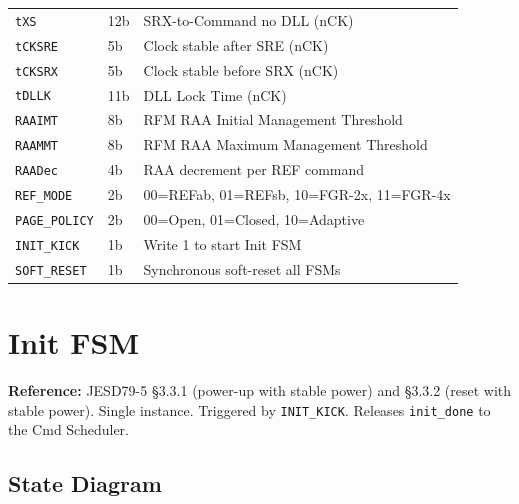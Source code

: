 \documentclass[11pt,a4paper]{article}
\newcommand{\reg}[1]{\textcolor{ddrpurple}{\texttt{#1}}}
\begin{document}
\begin{longtable}{L{3cm} L{2cm} L{9.3cm}}
\reg{tXS}         & 12b & SRX-to-Command no DLL (nCK) \\
\reg{tCKSRE}      & 5b & Clock stable after SRE (nCK) \\
\reg{tCKSRX}      & 5b & Clock stable before SRX (nCK) \\
\reg{tDLLK}       & 11b & DLL Lock Time (nCK) \\
\reg{RAAIMT}      & 8b & RFM RAA Initial Management Threshold \\
\reg{RAAMMT}      & 8b & RFM RAA Maximum Management Threshold \\
\reg{RAADec}      & 4b & RAA decrement per REF command \\
\reg{REF\_MODE}   & 2b & 00=REFab, 01=REFsb, 10=FGR-2x, 11=FGR-4x \\
\reg{PAGE\_POLICY}& 2b & 00=Open, 01=Closed, 10=Adaptive \\
\reg{INIT\_KICK}  & 1b & Write 1 to start Init FSM \\
\reg{SOFT\_RESET} & 1b & Synchronous soft-reset all FSMs \\
\end{longtable}

\section{Init FSM}

\begin{notebox}
\textbf{Reference:} JESD79-5 §3.3.1 (power-up with stable power) and §3.3.2 (reset with stable power).
Single instance. Triggered by \reg{INIT\_KICK}. Releases \texttt{init\_done} to the Cmd Scheduler.
\end{notebox}

\subsection{State Diagram}
\end{document}

